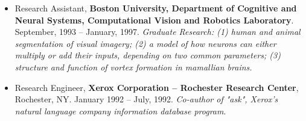 \documentclass[conference,lettersize,twocolumn,twosize]{./IEEEtran}
\begin{document}
\begin{center}
\begin{itemize}
  \item{Research Assistant, {\bf Boston University, Department of
      Cognitive and Neural Systems, Computational Vision and Robotics
      Laboratory}. September, 1993 -- January, 1997. \emph{Graduate
      Research: (1) human and animal segmentation of visual imagery;
      (2) a model of how neurons can either multiply or add their
      inputs, depending on two common parameters; (3) structure and
      function of vortex formation in mamallian brains.}}
  \item{Research Engineer, {\bf Xerox Corporation -- Rochester
      Research Center}, Rochester, NY. January 1992 -- July,
    1992. \emph{Co-author of "ask", Xerox's natural language company
      information database program}.}
  \end{itemize}
\end{center}
\end{document}

